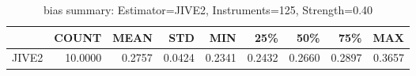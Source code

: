 \begin{table}[ht]
\centering
\caption{bias summary: Estimator=JIVE2, Instruments=125, Strength=0.40}
\begin{tabular}{lrrrrrrrr}
\toprule
 & COUNT & MEAN & STD & MIN & 25\% & 50\% & 75\% & MAX \\
\midrule
JIVE2 & 10.0000 & 0.2757 & 0.0424 & 0.2341 & 0.2432 & 0.2660 & 0.2897 & 0.3657 \\
\bottomrule
\end{tabular}
\end{table}
